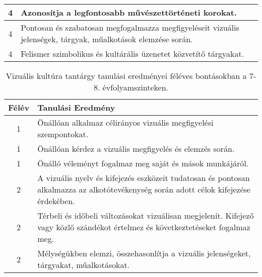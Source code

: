 \begin{longtable}{c | p{} }
                                
                                          4 &  Azonosítja a legfontosabb művészettörténeti korokat. \\ \hline
                                          4 &  Pontosan és szabatosan megfogalmazza megfigyeléseit vizuális jelenségek, tárgyak, műalkotások elemzése során. \\ \hline
                                          4 &  Felismer szimbolikus és kultárális üzenetet közvetítő tárgyakat. \\ \hline
                                      
                        \end{longtable}
            \clearpage

       
           \begin{longtable}{c | p{} }
            \caption[Vizuális kultúra 7-8.]{Vizuális kultúra tantárgy tanulási eredményei féléves bontásokban a 7-8. évfolyamszinteken. }  \\

            \textbf{Félév} & \textbf{Tanulási Eredmény} \\
            \hline
            \endhead
                                
                                          1 &  Önállóan alkalmaz célirányos vizuális megfigyelési szempontokat. \\ \hline
                                          1 &  Önállóan kérdez a vizuális megfigyelés és elemzés során. \\ \hline
                                          1 &  Önálló véleményt fogalmaz meg saját és mások munkájáról. \\ \hline
                                      
                                
                                          2 &  A vizuális nyelv és kifejezés eszközeit tudatosan és pontosan alkalmazza az alkotótevékenység során adott célok kifejezése érdekében. \\ \hline
                                          2 &  Térbeli és időbeli változásokat vizuálisan megjelenít. Kifejező vagy közlő szándékot értelmez és következtetéseket fogalmaz meg. \\ \hline
                                          2 &  Mélységükben elemzi, összehasonlítja a vizuális jelenségeket, tárgyakat, műalkotásokat. \\ \hline
                                      

\end{longtable}
